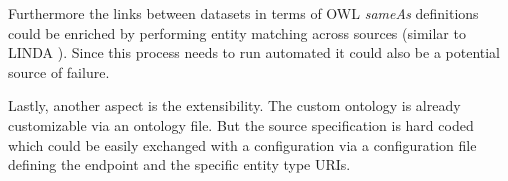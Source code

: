 Furthermore the links between datasets in terms of OWL \textit{sameAs} definitions could be enriched by performing entity matching across sources (similar to LINDA \cite{boehm_linda:_2012}). Since this process needs to run automated it could also be a potential source of failure. 

Lastly, another aspect is the extensibility. The custom ontology is already customizable via an ontology file. But the source specification is hard coded which could be easily exchanged with a configuration via a configuration file defining the endpoint and the specific entity type URIs. 



